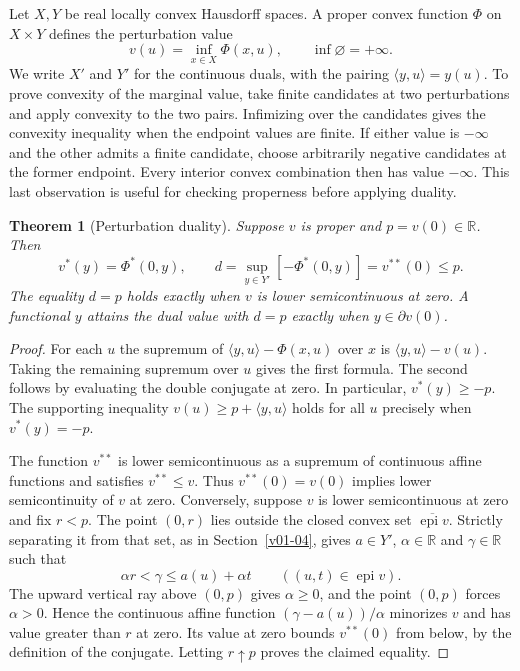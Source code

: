\documentclass[11pt,oneside,openany]{book}
\newcommand{\R}{\mathbb R}
\theoremstyle{plain}
\newtheorem{theorem}{Theorem}[chapter]
\theoremstyle{definition}
\theoremstyle{remark}
\begin{document}
Let \(X,Y\) be real locally convex Hausdorff spaces. A proper
convex function \(\Phi\) on \(X\times Y\) defines the perturbation value
\[
 v(u)=\inf_{x\in X}\Phi(x,u),\qquad \inf\varnothing=+\infty .
\]
We write \(X'\) and \(Y'\) for the continuous duals, with the pairing
\(\langle y,u\rangle=y(u)\). To prove convexity of the marginal value,
take finite candidates at two perturbations and apply convexity to
the two pairs. Infimizing over the candidates gives the convexity
inequality when the endpoint values are finite. If either value is
\(-\infty\) and the other admits a finite candidate, choose arbitrarily
negative candidates at the former endpoint. Every interior convex
combination then has value \(-\infty\). This last observation is useful
for checking properness before applying duality.

\begin{theorem}[Perturbation duality]\label{thm:perturbation-duality}
Suppose \(v\) is proper and \(p=v(0)\in\R\). Then
\[
 v^*(y)=\Phi^*(0,y),\qquad
 d=\sup_{y\in Y'}[-\Phi^*(0,y)]=v^{**}(0)\le p.
\]
The equality \(d=p\) holds exactly when \(v\) is lower
semicontinuous at zero. A functional \(y\) attains the dual value
with \(d=p\) exactly when \(y\in\partial v(0)\).
\end{theorem}

\begin{proof}
For each \(u\) the supremum of \(\langle y,u\rangle-\Phi(x,u)\)
over \(x\) is \(\langle y,u\rangle-v(u)\). Taking the remaining
supremum over \(u\) gives the first formula. The second follows
by evaluating the double conjugate at zero. In particular,
\(v^*(y)\ge -p\). The supporting inequality
\(v(u)\ge p+\langle y,u\rangle\) holds for all \(u\) precisely
when \(v^*(y)=-p\).

The function \(v^{**}\) is lower semicontinuous as a supremum
of continuous affine functions and satisfies \(v^{**}\le v\).
Thus \(v^{**}(0)=v(0)\) implies lower semicontinuity of \(v\)
at zero. Conversely, suppose \(v\) is lower semicontinuous at
zero and fix \(r<p\). The point \((0,r)\) lies outside the
closed convex set \(\overline{\operatorname{epi}v}\).
Strictly separating it from that set, as in
Section~\ref{v01-04}, gives \(a\in Y'\), \(\alpha\in\R\)
and \(\gamma\in\R\) such that
\[
 \alpha r<\gamma\le a(u)+\alpha t
 \qquad((u,t)\in\operatorname{epi}v).
\]
The upward vertical ray above \((0,p)\) gives \(\alpha\ge0\),
and the point \((0,p)\) forces \(\alpha>0\).
Hence the continuous affine function \((\gamma-a(u))/\alpha\)
minorizes \(v\) and has value greater than \(r\) at zero.
Its value at zero bounds \(v^{**}(0)\) from below, by the
definition of the conjugate. Letting \(r\uparrow p\) proves
the claimed equality.
\end{proof}
\end{document}
